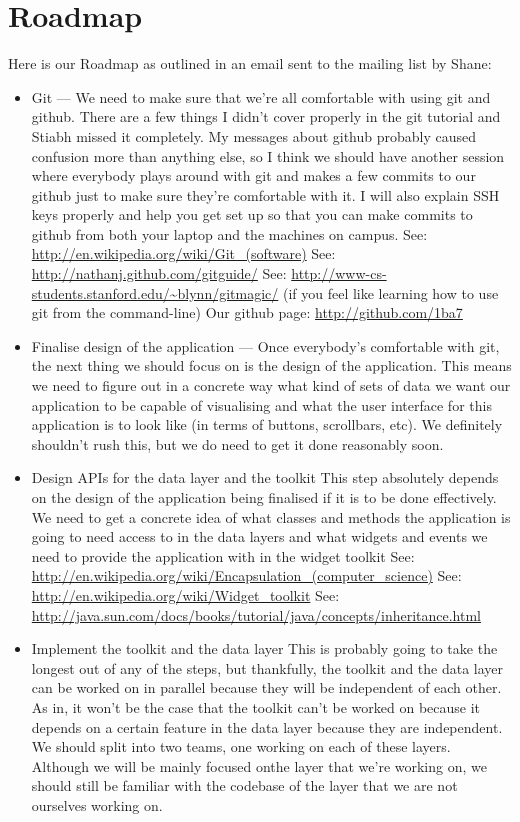 \documentclass[titlepage,a4paper]{article}
\begin{document}
\section{Roadmap}
Here is our Roadmap as outlined in an email sent to the mailing list by Shane:
\begin{itemize}
\item Git ---
We need to make sure that we're all comfortable with using git and
github. There are a few things I didn't cover properly in the git
tutorial and Stiabh missed it completely. My messages about github
probably caused confusion more than anything else, so I think we
should have another session where everybody plays around with git and
makes a few commits to our github just to make sure they're
comfortable with it. I will also explain SSH keys properly and help
you get set up so that you can make commits to github from both your
laptop and the machines on campus.
See: \url{http://en.wikipedia.org/wiki/Git_(software)}
See: \url{http://nathanj.github.com/gitguide/}
See: \url{http://www-cs-students.stanford.edu/~blynn/gitmagic/} (if you feel
like learning how to use git from the command-line)
Our github page: \url{http://github.com/1ba7}

\item Finalise design of the application ---
Once everybody's comfortable with git, the next thing we should focus
on is the design of the application. This means we need to figure out
in a concrete way what kind of sets of data we want our application to
be capable of visualising and what the user interface for this
application is to look like (in terms of buttons, scrollbars, etc). We
definitely shouldn't rush this, but we do need to get it done
reasonably soon.

\item Design APIs for the data layer and the toolkit
This step absolutely depends on the design of the application being
finalised if it is to be done effectively. We need to get a concrete
idea of what classes and methods the application is going to need
access to in the data layers and what widgets and events we need to
provide the application with in the widget toolkit
See: \url{http://en.wikipedia.org/wiki/Encapsulation_(computer_science)}
See: \url{http://en.wikipedia.org/wiki/Widget_toolkit}
See: \url{http://java.sun.com/docs/books/tutorial/java/concepts/inheritance.html}

\item Implement the toolkit and the data layer
This is probably going to take the longest out of any of the steps,
but thankfully, the toolkit and the data layer can be worked on in
parallel because they will be independent of each other. As in, it
won't be the case that the toolkit can't be worked on because it
depends on a certain feature in the data layer because they are
independent. We should split into two teams, one working on each of
these layers. Although we will be mainly focused onthe layer that
we're working on, we should still be familiar with the codebase of the
layer that we are not ourselves working on.


\end{itemize}
\end{document}
